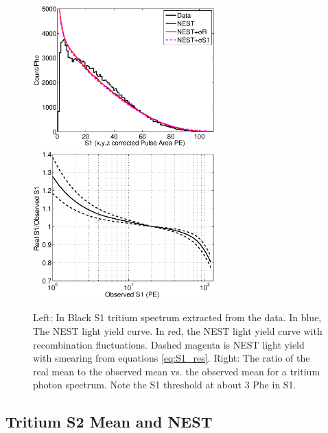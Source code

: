  \begin{figure}[h!]\centering
\includegraphics[width=70mm]{Recombination_LY_QY/Figures/S1S2_Spectra/S1_spec_compare_.eps}
\includegraphics[width=70mm]{Recombination_LY_QY/Figures/S1S2_Spectra/S1_corr_.eps}
\caption{Left: In Black S1 tritium spectrum extracted from the data. In blue, The NEST light yield curve. In red, the NEST light yield curve with recombination fluctuations. Dashed magenta is NEST light yield with smearing from equations \ref{eq:S1_res}.  Right: The ratio of the real mean to the observed mean vs. the observed mean for a tritium photon spectrum. Note the S1 threshold at about 3 Phe in S1. }
\label{fig:S1_mapping}
\end{figure}


\subsection{Tritium S2 Mean and NEST}

